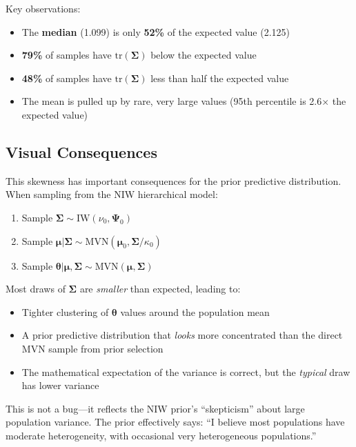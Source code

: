 \documentclass[11pt]{article}
\begin{document}
Key observations:
\begin{itemize}
  \item The \textbf{median} (1.099) is only \textbf{52\%} of the expected value (2.125)
  \item \textbf{79\%} of samples have $\text{tr}(\boldsymbol{\Sigma})$ below the expected value
  \item \textbf{48\%} of samples have $\text{tr}(\boldsymbol{\Sigma})$ less than half the expected value
  \item The mean is pulled up by rare, very large values (95th percentile is 2.6$\times$ the expected value)
\end{itemize}

\subsection{Visual Consequences}

This skewness has important consequences for the prior predictive distribution. When sampling from the NIW hierarchical model:
\begin{enumerate}
  \item Sample $\boldsymbol{\Sigma} \sim \text{IW}(\nu_0, \boldsymbol{\Psi}_0)$
  \item Sample $\boldsymbol{\mu} | \boldsymbol{\Sigma} \sim \text{MVN}(\boldsymbol{\mu}_0, \boldsymbol{\Sigma}/\kappa_0)$
  \item Sample $\boldsymbol{\theta} | \boldsymbol{\mu}, \boldsymbol{\Sigma} \sim \text{MVN}(\boldsymbol{\mu}, \boldsymbol{\Sigma})$
\end{enumerate}

Most draws of $\boldsymbol{\Sigma}$ are \textit{smaller} than expected, leading to:
\begin{itemize}
  \item Tighter clustering of $\boldsymbol{\theta}$ values around the population mean
  \item A prior predictive distribution that \textit{looks} more concentrated than the direct MVN sample from prior selection
  \item The mathematical expectation of the variance is correct, but the \textit{typical} draw has lower variance
\end{itemize}

This is not a bug---it reflects the NIW prior's ``skepticism'' about large population variance. The prior effectively says: ``I believe most populations have moderate heterogeneity, with occasional very heterogeneous populations.''
\end{document}
